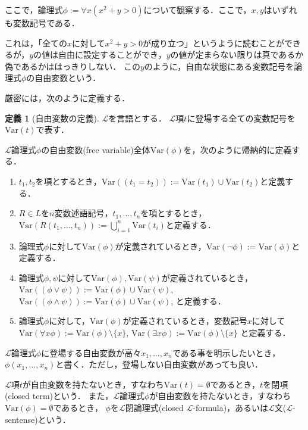 \documentclass[uplatex, dvipdfmx]{jsarticle}
\numberwithin{equation}{section}
\newcommand{\Var}{\mathrm{Var}}
\theoremstyle{definition}
\newtheorem{definition}{定義}[section]
\begin{document}

ここで，論理式$\phi := \forall x (x^2 + y > 0)$について観察する．ここで，$x,y$はいずれも変数記号である．

これは，「全ての$x$に対して$x^2 + y > 0$が成り立つ」というように読むことができるが，$y$の値は自由に設定することができ，$y$の値が定まらない限りは真であるか偽であるかははっきりしない．
この$y$のように，自由な状態にある変数記号を論理式$\phi$の自由変数という．

厳密には，次のように定義する．

\begin{definition}[自由変数の定義]
     $\mathcal{L}$を言語とする．
     $\mathcal{L}$項$t$に登場する全ての変数記号を$\Var(t)$で表す．

     $\mathcal{L}$論理式$\phi$の自由変数(free variable)全体$\Var(\phi)$を，次のように帰納的に定義する．
     \begin{enumerate}
          \item $t_1, t_2$を項とするとき，$\Var((t_1=t_2)):=\Var(t_1)\cup\Var(t_2)$と定義する．
          \item $R \in L$を$n$変数述語記号，$t_1, \dots, t_n$を項とするとき，$\Var(R(t_1, \dots, t_n)):= \bigcup_{i=1}^n \Var(t_i)$と定義する．
          \item 論理式$\phi$に対して$\Var(\phi)$が定義されているとき，$\Var(\lnot \phi):=\Var(\phi)$と定義する．
          \item 論理式$\phi, \psi$に対して$\Var(\phi), \Var(\psi)$が定義されているとき，
          $\Var((\phi \lor \psi)):=\Var(\phi)\cup\Var(\psi)$,
          $\Var((\phi \land \psi)):=\Var(\phi)\cup\Var(\psi)$,
          と定義する．
          \item 論理式$\phi$に対して，$\Var(\phi)$が定義されているとき，変数記号$x$に対して
          $\Var(\forall x\phi):=\Var(\phi) \setminus \{x\}$,
          $\Var(\exists x\phi):=\Var(\phi) \setminus \{x\}$
          と定義する．
     \end{enumerate}

     $\mathcal{L}$論理式$\phi$に登場する自由変数が高々$x_1, \dots, x_n$である事を明示したいとき，$\phi(x_1, \dots, x_n)$と書く．ただし，登場しない自由変数があっても良い．

     $\mathcal{L}$項$t$が自由変数を持たないとき，すなわち$\Var(t)=\emptyset$であるとき，$t$を閉項(closed term)という．
     また，$\mathcal{L}$論理式$\phi$が自由変数を持たないとき，すなわち$\Var(\phi)=\emptyset$であるとき，
     $\phi$を$\mathcal{L}$閉論理式(closed $\mathcal{L}$-formula)，あるいは$\mathcal{L}$文($\mathcal{L}$-sentense)という．
\end{definition}
\end{document}
